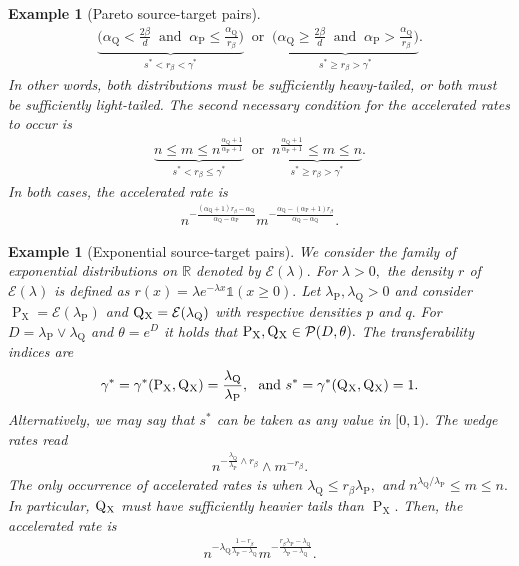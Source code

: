 \documentclass[10pt]{article}
\newcommand{\mE}{\mathcal{E}}
\newcommand{\mP}{\mathcal{P}}
\newcommand{\RR}{\mathbb{R}}
\renewcommand{\P}{\operatorname{P}}
\newcommand{\Q}{\operatorname{Q}}
\newcommand{\sX}{\mathrm{X}}
\newtheorem{example}[theorem]{Example}
\begin{document}
\begin{example}[Pareto source-target pairs]
\begin{align}
        \underbrace{\Big(\alpha_{\Q} < \frac{2\beta}{d} \ \text{ and } \ \alpha_{\P} \leq \frac{\alpha_{\Q}}{r_\beta}\Big)}_{s^* < r_\beta < \gamma^*} \ \text{ or } \ \underbrace{\Big(\alpha_{\Q} \geq \frac{2\beta}{d} \ \text{ and } \ \alpha_{\P} > \frac{\alpha_{\Q}}{r_\beta}\Big)}_{s^* \geq r_\beta > \gamma^*}.
    \end{align}
    In other words, both distributions must be sufficiently heavy-tailed, or both must be sufficiently light-tailed. The second necessary condition for the accelerated rates to occur is
    \begin{align*}
        \underbrace{n \leq m \leq n^{\tfrac{\alpha_{\Q} + 1}{\alpha_{\P} + 1}}}_{s^* < r_\beta \leq \gamma^*} \ \text{ or } \ \underbrace{n^{\tfrac{\alpha_{\Q} + 1}{\alpha_{\P} + 1}} \leq m \leq n}_{s^* \geq r_\beta > \gamma^*}.
    \end{align*}
    In both cases, the accelerated rate is
    \begin{align*}
        n^{-\tfrac{(\alpha_{\Q} + 1)r_\beta - \alpha_{\Q}}{\alpha_{\Q} - \alpha_{\P}}}m^{-\tfrac{\alpha_{\Q} - (\alpha_{\P} + 1)r_\beta}{\alpha_{\Q} - \alpha_{\Q}}}.
    \end{align*}
\end{example}


\begin{example}[Exponential source-target pairs]
    \label{ex.exponential}
    We consider the family of exponential distributions on $\RR$ denoted by $\mE(\lambda).$ For $\lambda > 0,$ the density $r$ of $\mE(\lambda)$ is defined as $r(x) = \lambda e^{-\lambda x}\mathds{1}(x \geq 0).$ Let $\lambda_{\P}, \lambda_{\Q} > 0$ and consider $\P_{\sX} = \mE(\lambda_{\P})$ and $\Q\mathstrut_{\!\sX} = \mE(\lambda_{\Q})$ with respective densities $p$ and $q.$ For $D = \lambda_{\P}\vee \lambda_{\Q}$ and $\theta = e^{D}$ it holds that $\P_{\sX}, \Q\mathstrut_{\!\sX} \in \mP(D, \theta).$ The transferability indices are
    \begin{align*}
        \gamma^* = \gamma^*(\P_{\sX}, \Q\mathstrut_{\!\sX}) = \frac{\lambda_{\Q}}{\lambda_{\P}}, \ \text{ and } s^* = \gamma^*(\Q\mathstrut_{\!\sX}, \Q\mathstrut_{\!\sX}) = 1.
    \end{align*}
    Alternatively, we may say that $s^*$ can be taken as any value in $[0, 1).$ The wedge rates read
    \begin{align*}
        n^{-\tfrac{\lambda_{\Q}}{\lambda_{\P}}\wedge r_\beta} \wedge m^{-r_\beta}.
    \end{align*}
    The only occurrence of accelerated rates is when $\lambda_{\Q} \leq r_\beta \lambda_{\P},$ and $n^{\lambda_{\Q}/\lambda_{\P}} \leq m \leq n.$ In particular, $\Q\mathstrut_{\!\sX}$ must have sufficiently heavier tails than $\P_{\sX}.$ Then, the accelerated rate is
    \begin{align*}
        n^{-\lambda_{\Q}\tfrac{1 - r_\beta}{\lambda_{\P} - \lambda_{\Q}}}m^{-\tfrac{r_\beta\lambda_{\P} - \lambda_{\Q}}{\lambda_{\P} - \lambda_{\Q}}}.
    \end{align*}
\end{example}
\end{document}
